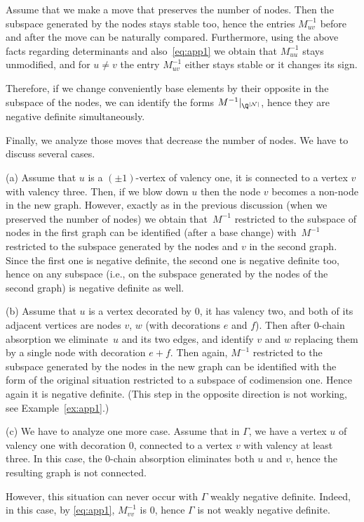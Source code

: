 \documentclass[10pt,a4paper]{amsart}
\begin{document}
Assume that we make a move that preserves the number of nodes. Then the subspace generated by the nodes stays stable too, hence the entries $M^{-1}_{uv}$ before and after the move can be naturally compared. Furthermore, using the above facts regarding determinants and also~\eqref{eq:app1} we obtain that $M^{-1}_{uu}$ stays unmodified, and
for $u\not=v$ the entry $M^{-1}_{uv}$ either stays stable or it changes its sign.

Therefore, if we change conveniently base elements by their opposite in the subspace of the nodes, we can identify the forms $M^{-1}|_{\Q^{|\mathcal{N}|}}$, hence they are negative definite simultaneously.

Finally, we analyze those moves that decrease the number of nodes. We have to discuss several cases.

(a) Assume that $u$ is a $(\pm 1)$-vertex of valency one, it is connected to a vertex $v$
with valency three. Then, if we blow down $u$ then the node $v$ becomes a non-node in the new graph. However, exactly as in the previous discussion (when we preserved the number of nodes) we obtain that~$M^{-1}$ restricted to the
subspace of nodes in the first graph can be identified (after a base change)
with~$M^{-1}$ restricted to the
subspace generated by the nodes and $v$ in the second graph.
Since the first one is negative definite, the second one is negative definite too,
hence on any subspace (i.e., on the subspace generated by the nodes of the second graph) is negative definite as well.

(b)
Assume that $u$ is a vertex decorated by 0, it has valency two, and both of its
adjacent vertices are nodes $v$, $w$ (with decorations $e$ and $f$).
Then after 0-chain absorption we eliminate~$u$ and its two edges, and identify
$v$ and $w$ replacing them by a single node with decoration $e+f$.
Then again, $M^{-1}$ restricted to the
subspace generated by the nodes in the new graph can be identified with
the form of the original situation restricted to a subspace of codimension one.
Hence again it is negative definite. (This step in the opposite direction is not working, see Example~\ref{ex:app1}.)

(c) We have to analyze one more case.
Assume that in $\Gamma$, we have a vertex $u$ of valency one with decoration $0$, connected to a vertex $v$
with valency at least three. In this case, the 0-chain absorption eliminates both $u$ and $v$, hence the resulting graph is not connected.

However, this situation can never occur with $\Gamma$ weakly negative definite.
Indeed, in this case, by \eqref{eq:app1}, $M^{-1}_{vv}$ is 0, hence
$\Gamma$ is not weakly negative definite.
\end{document}
